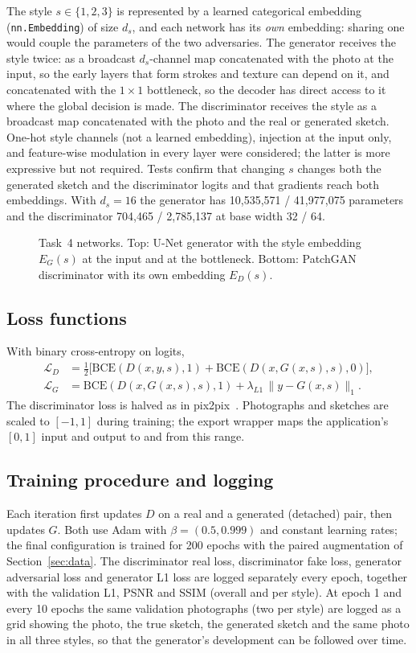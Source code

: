 \documentclass[conference]{IEEEtran}
\begin{document}
The style $s\in\{1,2,3\}$ is represented by a learned categorical embedding
(\texttt{nn.Embedding}) of size $d_s$, and each network has its \emph{own}
embedding: sharing one would couple the parameters of the two adversaries.
The generator receives the style twice: as a broadcast $d_s$-channel map
concatenated with the photo at the input, so the early layers that form
strokes and texture can depend on it, and concatenated with the $1\times1$
bottleneck, so the decoder has direct access to it where the global
decision is made. The discriminator receives the style as a broadcast map
concatenated with the photo and the real or generated sketch. One-hot style
channels (not a learned embedding), injection at the input only, and
feature-wise modulation in every layer were considered; the latter is more
expressive but not required. Tests confirm that changing $s$ changes both
the generated sketch and the discriminator logits and that gradients reach
both embeddings. With $d_s=16$ the generator has 10,535,571 / 41,977,075
parameters and the discriminator 704,465 / 2,785,137 at base width 32 / 64.

\begin{figure}[t]
\centering

\caption{Task~4 networks. Top: U-Net generator with the style embedding
$E_G(s)$ at the input and at the bottleneck. Bottom: PatchGAN discriminator
with its own embedding $E_D(s)$.}
\label{fig:task4_arch}
\end{figure}

\subsection{Loss functions}
With binary cross-entropy on logits,
\begin{align}
\mathcal{L}_D &= \tfrac12\bigl[\mathrm{BCE}(D(x,y,s),1)
  + \mathrm{BCE}(D(x,G(x,s),s),0)\bigr],\\
\mathcal{L}_G &= \mathrm{BCE}(D(x,G(x,s),s),1)
  + \lambda_{L1}\,\lVert y-G(x,s)\rVert_1 .
\end{align}
The discriminator loss is halved as in pix2pix~\cite{isola2017image}.
Photographs and sketches are scaled to $[-1,1]$ during training; the export
wrapper maps the application's $[0,1]$ input and output to and from this
range.

\subsection{Training procedure and logging}
Each iteration first updates $D$ on a real and a generated (detached) pair,
then updates $G$. Both use Adam with $\beta=(0.5,0.999)$ and constant
learning rates; the final configuration is trained for 200 epochs with the
paired augmentation of Section~\ref{sec:data}. The discriminator real loss,
discriminator fake loss, generator adversarial loss and generator L1 loss
are logged separately every epoch, together with the validation L1, PSNR and
SSIM (overall and per style). At epoch 1 and every 10 epochs the same
validation photographs (two per style) are logged as a grid showing the
photo, the true sketch, the generated sketch and the same photo in all three
styles, so that the generator's development can be followed over time.
\end{document}
